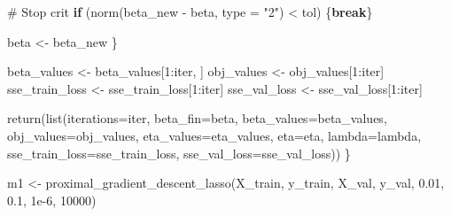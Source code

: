 \documentclass[
  letterpaper,
  DIV=11,
  numbers=noendperiod]{scrartcl}
\newenvironment{Shaded}{\begin{snugshade}}{\end{snugshade}}
\newcommand{\AttributeTok}[1]{\textcolor[rgb]{0.40,0.45,0.13}{#1}}
\newcommand{\CommentTok}[1]{\textcolor[rgb]{0.37,0.37,0.37}{#1}}
\newcommand{\ControlFlowTok}[1]{\textcolor[rgb]{0.00,0.23,0.31}{\textbf{#1}}}
\newcommand{\DecValTok}[1]{\textcolor[rgb]{0.68,0.00,0.00}{#1}}
\newcommand{\FloatTok}[1]{\textcolor[rgb]{0.68,0.00,0.00}{#1}}
\newcommand{\FunctionTok}[1]{\textcolor[rgb]{0.28,0.35,0.67}{#1}}
\newcommand{\NormalTok}[1]{\textcolor[rgb]{0.00,0.23,0.31}{#1}}
\newcommand{\OtherTok}[1]{\textcolor[rgb]{0.00,0.23,0.31}{#1}}
\newcommand{\SpecialCharTok}[1]{\textcolor[rgb]{0.37,0.37,0.37}{#1}}
\newcommand{\StringTok}[1]{\textcolor[rgb]{0.13,0.47,0.30}{#1}}
\begin{document}
\begin{Shaded}
\begin{Highlighting}[]
    \CommentTok{\# Stop crit}
    \ControlFlowTok{if}\NormalTok{ (}\FunctionTok{norm}\NormalTok{(beta\_new }\SpecialCharTok{{-}}\NormalTok{ beta, }\AttributeTok{type =} \StringTok{"2"}\NormalTok{) }\SpecialCharTok{\textless{}}\NormalTok{ tol) \{}\ControlFlowTok{break}\NormalTok{\}}
    
\NormalTok{    beta }\OtherTok{\textless{}{-}}\NormalTok{ beta\_new}
\NormalTok{  \}}
  
\NormalTok{  beta\_values }\OtherTok{\textless{}{-}}\NormalTok{ beta\_values[}\DecValTok{1}\SpecialCharTok{:}\NormalTok{iter, ]}
\NormalTok{  obj\_values }\OtherTok{\textless{}{-}}\NormalTok{ obj\_values[}\DecValTok{1}\SpecialCharTok{:}\NormalTok{iter]}
\NormalTok{  sse\_train\_loss }\OtherTok{\textless{}{-}}\NormalTok{ sse\_train\_loss[}\DecValTok{1}\SpecialCharTok{:}\NormalTok{iter]}
\NormalTok{  sse\_val\_loss }\OtherTok{\textless{}{-}}\NormalTok{ sse\_val\_loss[}\DecValTok{1}\SpecialCharTok{:}\NormalTok{iter]}

  \FunctionTok{return}\NormalTok{(}\FunctionTok{list}\NormalTok{(}\AttributeTok{iterations=}\NormalTok{iter, }\AttributeTok{beta\_fin=}\NormalTok{beta, }\AttributeTok{beta\_values=}\NormalTok{beta\_values, }\AttributeTok{obj\_values=}\NormalTok{obj\_values, }\AttributeTok{eta\_values=}\NormalTok{eta\_values, }\AttributeTok{eta=}\NormalTok{eta, }\AttributeTok{lambda=}\NormalTok{lambda, }\AttributeTok{sse\_train\_loss=}\NormalTok{sse\_train\_loss, }\AttributeTok{sse\_val\_loss=}\NormalTok{sse\_val\_loss))}
\NormalTok{\}}
\end{Highlighting}
\end{Shaded}

\begin{Shaded}
\begin{Highlighting}[]
\NormalTok{m1 }\OtherTok{\textless{}{-}} \FunctionTok{proximal\_gradient\_descent\_lasso}\NormalTok{(X\_train, y\_train, X\_val, y\_val, }\FloatTok{0.01}\NormalTok{, }\FloatTok{0.1}\NormalTok{, }\FloatTok{1e{-}6}\NormalTok{, }\DecValTok{10000}\NormalTok{)}
\end{Highlighting}
\end{Shaded}

\begin{Shaded}
\end{Shaded}
\end{document}
